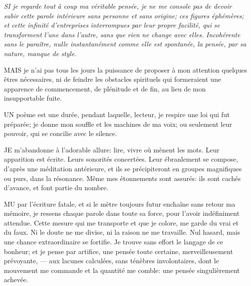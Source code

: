 {\itshape
SI je regarde tout à coup ma véritable pensée, je ne me console
pas de devoir subir cette parole intérieure sans personne et sans
origine; ces figures éphémères; et cette infinité
d'entreprises interrompues par leur propre facilité, qui se
transforment l'une dans l'autre, sans que rien ne change avec
elles. Incohérente sans le paraître, nulle instantanément
comme elle est spontanée, la pensée, par sa nature, manque de
style.

MAIS je n'ai pas tous les jours la puissance de proposer à mon
attention quelques êtres nécessaires, ni de feindre les obstacles
spirituels qui formeraient une apparence de commencement, de
plénitude et de fin, au lieu de mon insupportable fuite.

UN poème est une durée, pendant laquelle, lecteur, je respire une
loi qui fut préparée; je donne mon souffle et les machines de ma
voix; ou seulement leur pouvoir, qui se concilie avec le silence.

JE m'abandonne à l'adorable allure: lire, vivre où mènent les
mots. Leur apparition est écrite. Leurs sonorités concertées. Leur
ébranlement se compose, d'après une méditation antérieure, et
ils se précipiteront en groupes magnifiques ou purs, dans la
résonance. Même mes étonnements sont assurés: ils sont cachés
d'avance, et font partie du nombre.

MU par l'écriture fatale, et si le mètre toujours futur enchaîne sans
retour ma mémoire, je ressens chaque parole dans toute sa force, pour
l'avoir indéfiniment attendue. Cette mesure qui me transporte et que
je colore, me garde du vrai et du faux. Ni le doute ne me divise, ni
la raison ne me travaille. Nul hasard, mais une chance extraordinaire
se fortifie. Je trouve sans effort le langage de ce bonheur; et je
pense par artifice, une pensée toute certaine, merveilleusement
prévoyante, --- aux lacunes calculées, sans ténèbres involontaires,
dont le mouvement me commande et la quantité me comble: une pensée
singulièrement achevée.
}
